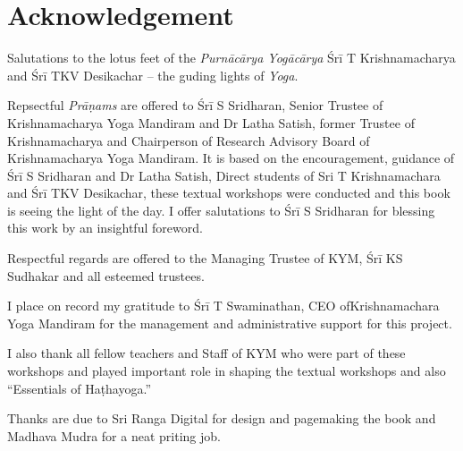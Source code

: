 \thispagestyle{empty}

\chapter*{Acknowledgement}\label{ack}

Salutations to the lotus feet of the \textit{Purnācārya Yogācārya} Śrī T Krishnamacharya and Śrī TKV Desikachar – the guding lights of \textit{Yoga}.

Repsectful \textit{Prāṇams} are offered to Śrī S Sridharan, Senior Trustee of Krishnamacharya Yoga Mandiram and Dr Latha Satish, former Trustee of Krishnamacharya and Chairperson of Research Advisory Board of Krishnamacharya Yoga Mandiram. It is based on the encouragement, guidance of Śrī S Sridharan and Dr Latha Satish, Direct students of Sri T Krishnamachara and Śrī TKV Desikachar, these textual workshops were conducted and this book is seeing the light of the day. I offer salutations to Śrī S Sridharan for blessing this work by an insightful foreword. 

Respectful regards are offered to the Managing Trustee of KYM, Śrī KS Sudhakar and all esteemed trustees. 

I place on record my gratitude to Śrī T Swaminathan, CEO of\break Krishnamachara Yoga Mandiram for the management and administrative support for this project. 

I also thank all fellow teachers and Staff of KYM who were part of these workshops and played important role in shaping the textual workshops and also “Essentials of Haṭhayoga.”

Thanks are due to Sri Ranga Digital for design and pagemaking the book and Madhava Mudra for a neat priting job.

